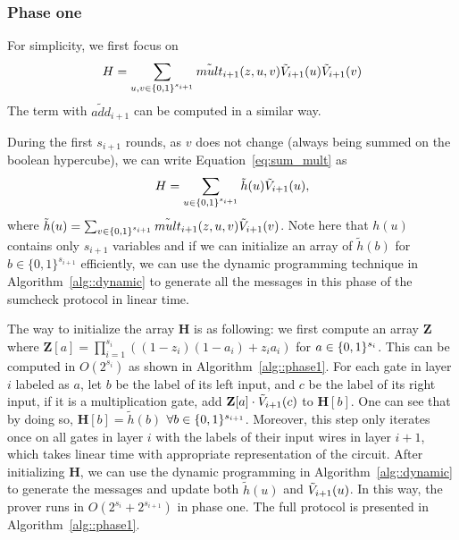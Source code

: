 \subsubsection{Phase one}

For simplicity, we first focus on 
\begin{equation}\label{eq:sum_mult}
H = \sum_{u, v \in \{0,1\}^{s_{i+1}}}\tilde{mult}_{i+1}(z,u,v)\tilde{V}_{i+1}(u)\tilde{V}_{i+1}(v)
\end{equation}
The term with $\tilde{add}_{i+1}$ can be computed in a similar way. 

During the first $s_{i+1}$ rounds, as $v$ does not change (always being summed on the boolean hypercube), we can write Equation~\ref{eq:sum_mult} as 
\[
H = \sum_{u\in\{0,1\}^{s_{i+1}}}\tilde{h}(u)\tilde{V}_{i+1}(u),
\]
where $\tilde{h}(u) = \sum_{v\in\{0,1\}^{s_{i+1}}}\tilde{mult}_{i+1}(z,u,v)\tilde{V}_{i+1}(v)$. Note here that $h(u)$ contains only $s_{i+1}$ variables and if we can initialize an array of $\tilde{h}(b)$ for $b\in\{0,1\}^{s_{i+1}}$ efficiently, we can use the dynamic programming technique in Algorithm~\ref{alg::dynamic} to generate all the messages in this phase of the sumcheck protocol in linear time. 

The way to initialize the array \textbf{H} is as following: we first compute an array \textbf{Z} where $\textbf{Z}[a] = \prod_{i=1}^{s_i} ((1-z_i)(1-a_i)+z_ia_i)$ for $a\in\{0,1\}^{s_{i}}$. This can be computed in $O(2^{s_i})$ as shown in Algorithm~\ref{alg::phase1}. For each gate in layer $i$ labeled as $a$, let $b$ be the label of its left input, and $c$ be the label of its right input, if it is a multiplication gate, add $\textbf{Z}[a]\cdot \tilde{V}_{i+1}(c)$ to $\textbf{H}[b]$. One can see that by doing so, $\textbf{H}[b] = \tilde{h}(b)$ $\forall b\in\{0,1\}^{s_{i+1}}$. Moreover, this step only iterates once on all gates in layer $i$ with the labels of their input wires in layer $i+1$, which takes linear time with appropriate representation of the circuit. After initializing $\textbf{H}$, we can use the dynamic programming in Algorithm~\ref{alg::dynamic} to generate the messages and update both $\tilde{h}(u)$ and $\tilde{V}_{i+1}(u)$. In this way, the prover runs in $O(2^{s_i}+2^{s_{i+1}})$ in phase one. The full protocol is presented in Algorithm~\ref{alg::phase1}.

